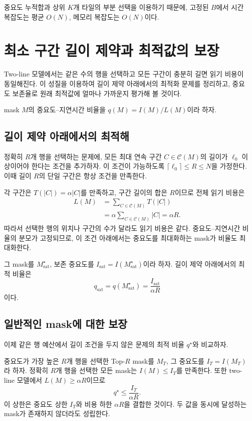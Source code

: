 중요도 누적합과 상위 $K$개 타일의 부분 선택을 이용하기 때문에, 고정된 $B$에서 시간 복잡도는 평균 $O(N)$, 메모리 복잡도는 $O(N)$이다.

\section{최소 구간 길이 제약과 최적값의 보장}\label{sec:guarantee}

Two-line 모델에서는 같은 수의 행을 선택하고 모든 구간이 충분히 길면 읽기 비용이 동일해진다. 이 성질을 이용하여 길이 제약 아래에서의 최적화 문제를 정리하고, 중요도 보존율로 원래 최적값에 얼마나 가까운지 평가해 볼 것이다.

mask $M$의 중요도--지연시간 비율을 $q(M)=I(M)/L(M)$이라 하자.

\subsection{길이 제약 아래에서의 최적해}\label{sec:guarantee-constrained}

정확히 $R$개 행을 선택하는 문제에, 모든 최대 연속 구간 $C\in\mathcal C(M)$의 길이가 $\ell_0$ 이상이어야 한다는 조건을 추가하자. 이 조건이 가능하도록 $\lceil\ell_0\rceil\le R\le N$을 가정한다. 이때 길이 $R$의 단일 구간은 항상 조건을 만족한다.

각 구간은 $T(|C|)=\alpha|C|$를 만족하고, 구간 길이의 합은 $R$이므로 전체 읽기 비용은
\[
\begin{aligned}
L(M)
&=\sum_{C\in\mathcal C(M)}T(|C|)\\
&=\alpha\sum_{C\in\mathcal C(M)}|C|
=\alpha R.
\end{aligned}
\]
따라서 선택한 행의 위치나 구간의 수가 달라도 읽기 비용은 같다. 중요도--지연시간 비율의 분모가 고정되므로, 이 조건 아래에서는 중요도를 최대화하는 mask가 비율도 최대화한다.

그 mask를 $M_{\mathrm{sat}}^\star$, 보존 중요도를 $I_{\mathrm{sat}}=I(M_{\mathrm{sat}}^\star)$이라 하자. 길이 제약 아래에서의 최적 비율은
\[
q_{\mathrm{sat}}
=q(M_{\mathrm{sat}}^\star)
=\frac{I_{\mathrm{sat}}}{\alpha R}
\]
이다.

\subsection{일반적인 mask에 대한 보장}\label{sec:guarantee-general}

이제 같은 행 예산에서 길이 조건을 두지 않은 문제의 최적 비율 $q^\star$와 비교하자.

중요도가 가장 높은 $R$개 행을 선택한 Top-$R$ mask를 $M_T$, 그 중요도를 $I_T=I(M_T)$라 하자. 정확히 $R$개 행을 선택한 모든 mask는 $I(M)\le I_T$를 만족한다. 또한 two-line 모델에서 $L(M)\ge\alpha R$이므로
\[
q^\star\le\frac{I_T}{\alpha R}.
\]
이 상한은 중요도 상한 $I_T$와 비용 하한 $\alpha R$을 결합한 것이다. 두 값을 동시에 달성하는 mask가 존재하지 않더라도 성립한다.

